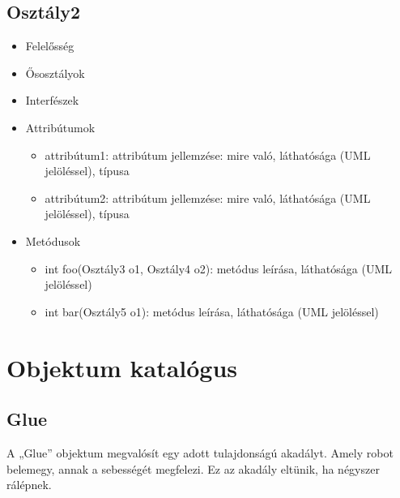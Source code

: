 \subsection{Osztály2}
\begin{itemize}
\item Felelősség\newline
{}
\item Ősosztályok\newline
{}
\item Interfészek\newline
{}
\item Attribútumok\newline
{}
	\begin{itemize}
		\item attribútum1: attribútum jellemzése: mire való, láthatósága (UML jelöléssel), típusa
		\item attribútum2: attribútum jellemzése: mire való, láthatósága (UML jelöléssel), típusa
	\end{itemize}
\item Metódusok\newline
{}
	\begin{itemize}
		\item int foo(Osztály3 o1, Osztály4 o2): metódus leírása, láthatósága (UML jelöléssel)
		\item int bar(Osztály5 o1): metódus leírása, láthatósága (UML jelöléssel)
	\end{itemize}
\end{itemize}

\section{Objektum katalógus}

\subsection{Glue}
A „Glue” objektum megvalósít egy adott tulajdonságú akadályt. Amely robot belemegy, annak a sebességét megfelezi. Ez az akadály eltünik, ha négyszer rálépnek.
